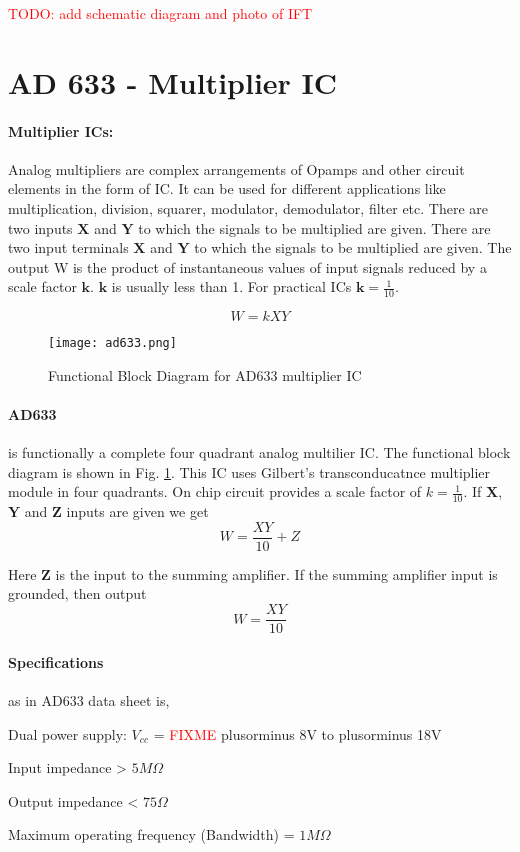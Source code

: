 \textcolor{red}{TODO: add schematic diagram and photo of IFT}
\section{AD 633 - Multiplier IC}
\paragraph{Multiplier ICs:}
 Analog multipliers are complex arrangements of Opamps and other circuit elements in the form of IC. It can be used for different applications like multiplication, division, squarer, modulator, demodulator, filter etc. There are two inputs $\textbf{X}$ and $\textbf{Y}$ to which the signals to be multiplied are given.
There are two input terminals $\textbf{X}$ and $\textbf{Y}$ to which the signals to be multiplied are given. The output W is the product of instantaneous values of input signals reduced by a scale factor $\textbf{k}$. $\textbf{k}$ is usually less than 1. For practical ICs $\textbf{k}=\frac{1}{10}$.

\begin{equation}
W=kXY
\end{equation}

\begin{figure}[h]
\texttt{[image: ad633.png]}
\caption{Functional Block Diagram for AD633 multiplier IC}
\label{ad633}
\end{figure}

\paragraph{AD633} is functionally a complete four quadrant analog multilier IC. The functional block diagram is shown in Fig. \ref{ad633}. This IC uses Gilbert's transconducatnce multiplier module in four quadrants. On chip circuit provides a scale factor of $k=\frac{1}{10}$. If $\textbf{X}$, $\textbf{Y}$ and $\textbf{Z}$ inputs are given we get 
\begin{equation}
W=\frac{XY}{10}+Z
\end{equation}

Here $\textbf{Z}$ is the input to the summing amplifier. If the summing amplifier input is grounded, then output 
\begin{equation}
W=\frac{XY}{10}
\end{equation}

\paragraph{Specifications}as in AD633 data sheet is,

\noindent Dual power supply: $V_{cc}$ = \textcolor{red}{FIXME} plusorminus 8V to plusorminus 18V

\noindent Input impedance > $5 M \Omega$

\noindent Output impedance < $75  \Omega$

\noindent Maximum operating frequency (Bandwidth) = $1 M\Omega$

